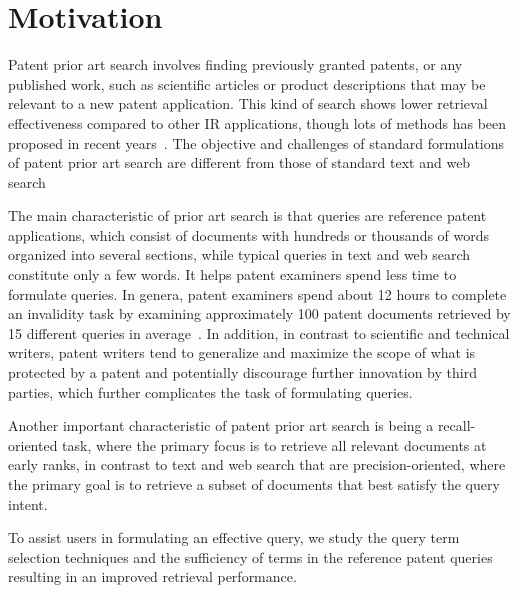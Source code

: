 \section{Motivation}
\label{sec:Motivation}
Patent prior art search involves finding previously granted patents,
or any published work, such as scientific articles or product
descriptions that may be relevant to a new patent application. 
This kind of search shows lower retrieval effectiveness compared to other IR applications, 
though lots of methods has been proposed in recent years~\citep{lupu2013patent}. 
The objective and challenges of standard formulations of patent prior art
search are different from those of standard text and web search~\cite{magdy2012toward}

The main characteristic of prior art search is that queries are reference patent
applications, which consist of documents with hundreds or thousands of
words organized into several sections, while typical queries in text
and web search constitute only a few words. It helps patent examiners spend less time to  
formulate queries. In genera, patent
examiners spend about 12 hours to complete an invalidity task by examining
approximately 100 patent documents retrieved by 15 different queries in average~\citep{joho2010survey}.
In addition, in contrast to scientific and technical writers, patent writers
tend to generalize and maximize the scope of what is protected by a
patent and potentially discourage further innovation by third parties,
which further complicates the task of formulating queries.

Another important characteristic of patent prior art
search is being a recall-oriented task, where the primary focus is to
retrieve all relevant documents at early ranks, in contrast to text
and web search that are precision-oriented, where the primary goal is
to retrieve a subset of documents that best satisfy the query
intent. 

To assist users in formulating an effective query, we study 
the query term selection techniques and the sufficiency of 
terms in the reference patent queries resulting in an improved retrieval performance.  

